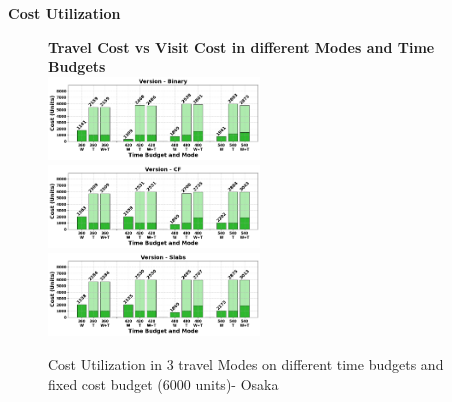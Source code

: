 \noindent\textbf{Cost Utilization}

\begin{figure}[th]
\textbf{Travel Cost vs Visit Cost in different Modes and Time Budgets}\\
\includegraphics[width=0.5\textwidth]{plots/CU3_pkj.png}
\includegraphics[width=0.5\textwidth]{plots/CU1_pkj.png}
\includegraphics[width=0.5\textwidth]{plots/CU2_pkj.png}
\hspace{8pt}
\caption{Cost Utilization in 3 travel Modes on different time budgets and fixed cost budget (6000 units)- Osaka}
\label{fig:CostUtilization1}
\end{figure}

